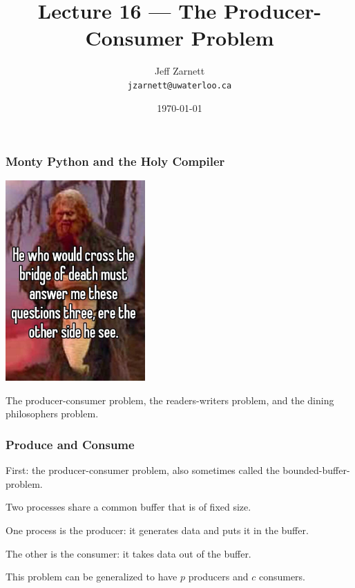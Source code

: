 

\title{Lecture 16 --- The Producer-Consumer Problem }

\author{Jeff Zarnett \\ \small \texttt{jzarnett@uwaterloo.ca}}
\date{\today}




\begin{frame}
	\titlepage

\end{frame}


\begin{frame}
	\frametitle{Monty Python and the Holy Compiler}

	\begin{center}
		\includegraphics[width=0.4\textwidth]{images/three-riddles.jpg}
	\end{center}

	The producer-consumer problem, the readers-writers problem, and the dining philosophers problem.

\end{frame}


\begin{frame}
	\frametitle{Produce and Consume}

	First: the producer-consumer problem, also sometimes called the bounded-buffer-problem.

	Two processes share a common buffer that is of fixed size.

	One process is the producer: it generates data and puts it in the buffer.

	The other is the consumer: it takes data out of the buffer.

	This problem can be generalized to have $p$ producers and $c$ consumers.

\end{frame}

